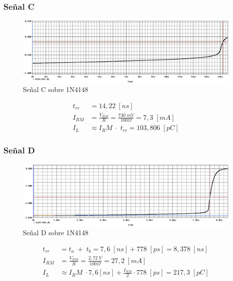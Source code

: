 \documentclass{article}
\begin{document}
\subsubsection{Señal C}
\begin{figure}[h!]
 \begin{center}
	\includegraphics[width=\textwidth]{imagenes/1N4148_C.jpg} 
	\caption{Señal C sobre 1N4148}
 \end{center}
\end{figure}
\begin{align*}
	t_{rr} &= 14,22 \; [ns] \\
	I_{RM}	&= \frac{V_{RM}}{R} = \frac{730 \; mV}{100 \Omega} = 7,3 \; [mA] \\
	I_L	&\approx {I_RM} \; \cdot \; t_{rr} = 103,806 \; [pC]
\end{align*}
%

\clearpage
\subsubsection{Señal D}
\begin{figure}[h!]
 \begin{center}
	\includegraphics[width=\textwidth]{imagenes/1N4148_D.jpg} 
	\caption{Señal D sobre 1N4148}
 \end{center}
\end{figure}
\begin{align*}
	t_{rr} &= t_a \;+\; t_b = 7,6 \; [ns] + 778 \; [ps] = 8,378 \; [ns] \\
	I_{RM}	&= \frac{V_{RM}}{R} = \frac{2,72 \; V}{100 \Omega} = 27,2 \; [mA] \\
	I_L	&\approx {I_RM} \; \cdot 7,6 [ns] + \frac{I_{RM}}{2} \cdot 778 \; [ps] = 217,3 \; [pC]
\end{align*}
\end{document}
